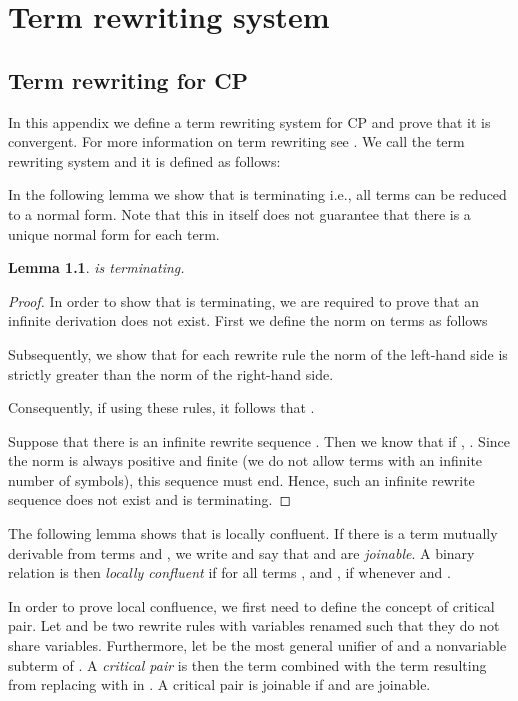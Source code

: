 \documentclass[a4paper,twoside,openright]{report}
\newtheorem{lem}[theorem]{Lemma}
\begin{document}
\chapter{Term rewriting system}

\section{Term rewriting for CP}
In this appendix we define a term rewriting system for CP and prove that it is convergent. For more information on term rewriting see \cite{rewriting}. We call the term rewriting system  and it is defined as follows:


In the following lemma we show that  is terminating i.e., all terms can be reduced to a normal form. Note that this in itself does not guarantee that there is a unique normal form for each term.

\begin{lem}
 is terminating.
\end{lem}
\begin{proof}
In order to show that  is terminating, we are required to prove that an infinite derivation  does not exist. First we define the norm on terms as follows

Subsequently, we show that for each rewrite rule the norm of the left-hand side 
is strictly greater than the norm of the right-hand side.

Consequently, if  using these rules, it follows that .

Suppose that there is an infinite rewrite sequence . Then we know that if , . Since the norm is always positive and finite (we do not allow terms with an infinite number of symbols), this sequence must end. Hence, such an infinite rewrite sequence does not exist and  is terminating.
\end{proof}

The following lemma shows that  is locally confluent. If there is a term  mutually derivable from terms  and , we write  and say that  and  are \emph{joinable}. A binary relation  is then \emph{locally confluent} if for all terms ,  and , if  whenever  and .

In order to prove local confluence, we first need to define the concept of critical pair. Let  and  be two rewrite rules with variables renamed such that they do not share variables. Furthermore, let  be the most general unifier of  and a nonvariable subterm  of . A \emph{critical pair} is then the term  combined with the term resulting from replacing  with  in . A critical pair  is joinable if  and  are joinable.
\end{document}
